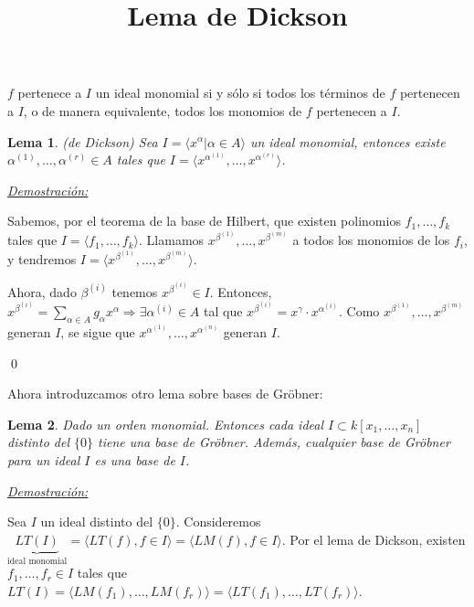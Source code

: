 \documentclass{article}
\newtheorem{lem}{Lema}
\begin{document}
\title{Lema de Dickson}
\maketitle

\large


$f$ pertenece a $I$ un ideal monomial si y sólo si todos los términos de $f$ pertenecen a $I$, o de manera equivalente, todos los monomios de $f$ pertenecen a $I$.

\begin{lem}
(de Dickson) Sea $I=\langle x^\alpha | \alpha \in A \rangle $ un ideal monomial, entonces existe $\alpha^{(1)},\dots ,\alpha^{(r)}\in A$ tales que $I=\langle x^{\alpha^{(1)}},\dots,x^{\alpha^{(r)}}\rangle$.
\end{lem}

\underline{\textit{Demostración:}}

\vspace{3mm}

Sabemos, por el teorema de la base de Hilbert, que existen polinomios $f_1,\dots,f_k$ tales que $I=\langle f_1,\dots,f_k\rangle $. Llamamos $x^{\beta^{(1)}},\dots,x^{\beta^{(m)}}$ a todos los monomios de los $f_i$, y tendremos $I=\langle x^{\beta^{(1)}},\dots, x^{\beta^{(m)}}\rangle $.

Ahora, dado $\beta^{(i)}$ tenemos $x^{\beta^{(i)}}\in I$. Entonces, $x^{\beta^{(i)}}=\sum_{\alpha \in A}g_\alpha x^\alpha \Rightarrow \exists \alpha^{(i)}\in A$ tal que $x^{\beta^{(i)}}=x^\gamma \cdot x^{\alpha^{(i)}}$. Como $x^{\beta^{(1)}},\dots,x^{\beta^{(m)}}$ generan $I$, se sigue que $x^{\alpha^{(1)}},\dots,x^{\alpha^{(n)}}$ generan $I$.

\qed


Ahora introduzcamos otro lema sobre bases de Gröbner:

\begin{lem}
Dado un orden monomial. Entonces cada ideal $I\subset k[x_1,\dots,x_n]$ distinto del $\{0\}$ tiene una base de Gröbner. Además, cualquier base de Gröbner para un ideal $I$ es una base de $I$. 
\end{lem}

\underline{\textit{Demostración:}}

\vspace{3mm}

Sea $I$ un ideal distinto del $\{0\}$. Consideremos $\underbrace{LT(I)}_{\text{ideal monomial}}=\langle LT(f),f\in I  \rangle = \langle LM(f),f\in I \rangle $. Por el lema de Dickson, existen $f_1,\dots,f_r\in I$ tales que $LT(I)=\langle LM(f_1),\dots, LM(f_r)\rangle = \langle LT(f_1),\dots,LT(f_r)\rangle $.
\end{document}
